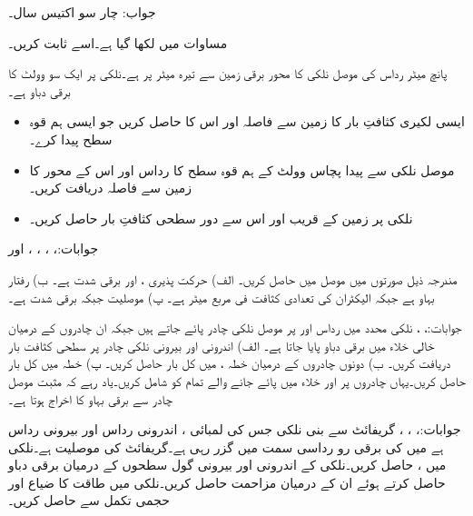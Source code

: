 جواب: چار سو اکتیس  سال۔ 

مساوات  میں   لکھا گیا ہے۔اسے ثابت کریں۔

پانچ میٹر رداس کی موصل نلکی کا محور برقی زمین سے تیرہ میٹر پر ہے۔نلکی پر ایک سو وولٹ کا برقی دباو ہے۔
\begin{itemize}
\item
ایسی لکیری کثافتِ بار کا زمین سے فاصلہ اور اس کا  حاصل کریں جو ایسی ہم قوہ سطح  پیدا کرے۔
\item
موصل نلکی سے پیدا پچاس وولٹ کے ہم قوہ سطح کا رداس اور اس کے محور کا زمین سے فاصلہ دریافت کریں۔
\item
نلکی پر زمین کے قریب اور اس سے دور سطحی کثافتِ بار حاصل کریں۔
\end{itemize} 

جوابات:، ، ، ،  اور 

مندرجہ ذیل صورتوں میں موصل میں  حاصل کریں۔ الف) حرکت پذیری ،  اور برقی شدت  ہے۔ ب) رفتار بہاو  ہے جبکہ الیکٹران کی تعدادی کثافت  فی مربع میٹر ہے۔ پ) موصلیت  جبکہ برقی شدت  ہے۔

جوابات:، ، 
نلکی محدد میں رداس  اور  پر موصل نلکی چادر پائے جاتے ہیں جبکہ ان چادروں کے درمیان خالی خلاء میں  برقی دباو پایا جاتا ہے۔ الف) اندرونی اور بیرونی نلکی چادر پر سطحی کثافت بار دریافت کریں۔ ب) دونوں چادروں کے درمیان خطہ ،  میں کل بار حاصل کریں۔ پ) خطہ  میں کل بار حاصل کریں۔یہاں چادروں پر اور خلاء میں پائے جانے والے تمام کو شامل کریں۔یاد رہے کہ مثبت موصل چادر سے برقی بہاو کا اخراج ہوتا ہے۔

جوابات:، ، ، 
گریفائٹ سے بنی  نلکی جس کی لمبائی ، اندرونی رداس  اور بیرونی رداس  ہے میں  کی برقی رو رداسی سمت میں  گزر رہی ہے۔گریفائٹ  کی موصلیت  ہے۔نلکی میں ،  حاصل کریں۔نلکی کے اندرونی اور بیرونی گول سطحوں کے درمیان برقی دباو  حاصل کرتے ہوئے ان کے درمیان مزاحمت  حاصل کریں۔نلکی میں طاقت کا ضیاع  اور حجمی تکمل  سے حاصل کریں۔

